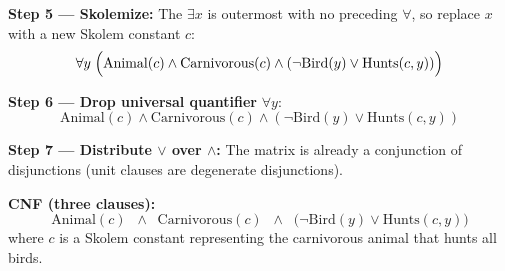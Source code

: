 \documentclass[11pt,a4paper]{article}
\newenvironment{solution}{%
    \begin{tcolorbox}[
        breakable,
        colback=green!4,
        colframe=green!50!black,
        fonttitle=\bfseries,
        title={ Solution},
        left=6pt, right=6pt, top=4pt, bottom=4pt
    ]%
    }{%
    \end{tcolorbox}%
}
\begin{document}
\begin{solution}
        \textbf{Step 5 — Skolemize:} The $\exists x$ is outermost with no preceding $\forall$, so replace $x$ with a new Skolem constant $c$:
        \[
            \forall y\;\Bigl(\mathrm{Animal}(c) \land \mathrm{Carnivorous}(c) \land (\neg\mathrm{Bird}(y) \lor \mathrm{Hunts}(c,y))\Bigr)
        \]

        \textbf{Step 6 — Drop universal quantifier} $\forall y$:
        \[
            \mathrm{Animal}(c) \land \mathrm{Carnivorous}(c) \land (\neg\mathrm{Bird}(y) \lor \mathrm{Hunts}(c,y))
        \]

        \textbf{Step 7 — Distribute $\lor$ over $\land$:} The matrix is already a conjunction of disjunctions (unit clauses are degenerate disjunctions).

        \medskip
        \textbf{CNF (three clauses):}
        \[
            \boxed{\mathrm{Animal}(c) \;\;\land\;\; \mathrm{Carnivorous}(c) \;\;\land\;\; \bigl(\neg\mathrm{Bird}(y) \lor \mathrm{Hunts}(c,y)\bigr)}
        \]
        where $c$ is a Skolem constant representing the carnivorous animal that hunts all birds.
    \end{solution}

\end{document}
